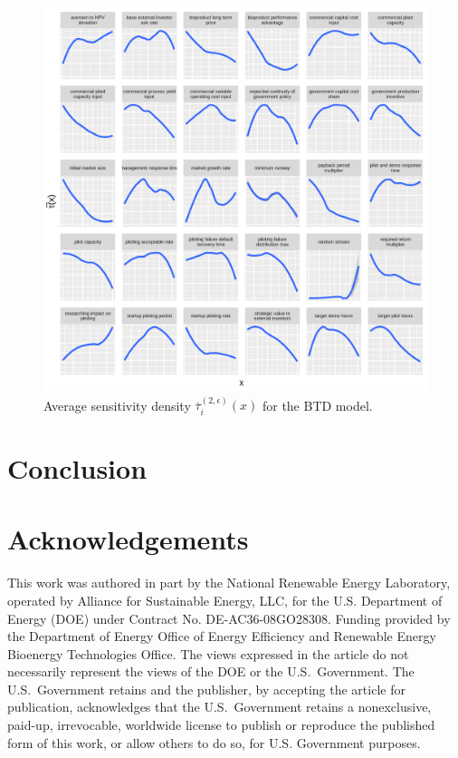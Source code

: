 \documentclass[12pt]{article}
\begin{document}
\begin{figure}
    \centering
    \includegraphics[width=\linewidth]{figures/btd-taubar.png}
    \caption{Average sensitivity density $\overline{\tau}_i^{(2,\epsilon)}(x)$ for the BTD model.}
    \label{fig:btd-taubar}
\end{figure}


\section{Conclusion}



\section*{Acknowledgements}

This work was authored in part by the National Renewable Energy Laboratory, operated by Alliance for Sustainable Energy, LLC, for the U.S. Department of Energy (DOE) under Contract No. DE-AC36-08GO28308. Funding provided by the Department of Energy Office of Energy Efficiency and Renewable Energy Bioenergy Technologies Office. The views expressed in the article do not necessarily represent the views of the DOE or the U.S.\ Government. The U.S.\ Government retains and the publisher, by accepting the article for publication, acknowledges that the U.S.\ Government retains a nonexclusive, paid-up, irrevocable, worldwide license to publish or reproduce the published form of this work, or allow others to do so, for U.S. Government purposes.
\end{document}
